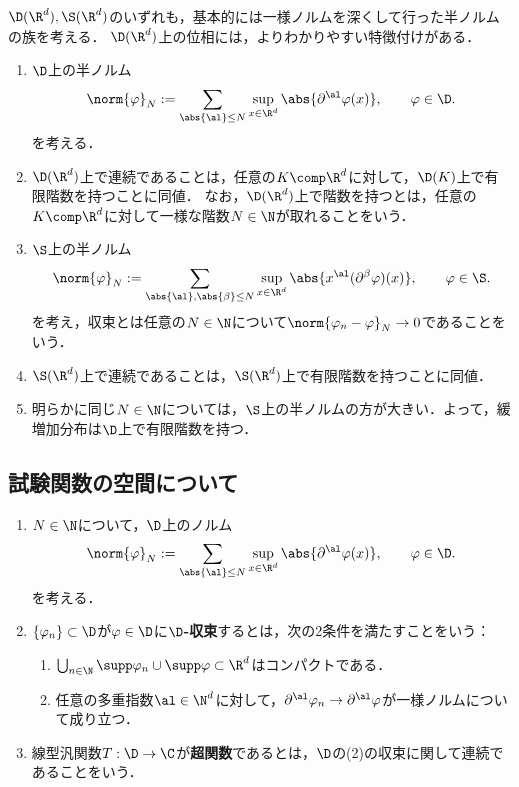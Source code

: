 \documentclass[uplatex,dvipdfmx]{jsreport}
\begin{document}
\begin{tcolorbox}[colframe=ForestGreen, colback=ForestGreen!10!white,breakable,colbacktitle=ForestGreen!40!white,coltitle=black,fonttitle=\bfseries\sffamily,
title=]
    $\D(\R^d),\S(\R^d)$のいずれも，基本的には一様ノルムを深くして行った半ノルムの族を考える．
    $\D(\R^d)$上の位相には，よりわかりやすい特徴付けがある．
    \begin{enumerate}
        \item $\D$上の半ノルム
        \[\norm{\varphi}_N:=\sum_{\abs{\al}\le N}\sup_{x\in\R^d}\abs{\partial^\al\varphi(x)},\qquad\varphi\in\D.\]
        を考える．
        \item $\D(\R^d)$上で連続であることは，任意の$K\comp\R^d$に対して，$\D(K)$上で有限階数を持つことに同値．
        なお，$\D(\R^d)$上で階数を持つとは，任意の$K\comp\R^d$に対して一様な階数$N\in\N$が取れることをいう．
        \item $\S$上の半ノルム
        \[\norm{\varphi}_N:=\sum_{\abs{\al},\abs{\beta}\le N}\sup_{x\in\R^d}\abs{x^\al(\partial^\beta\varphi)(x)},\qquad\varphi\in\S.\]
        を考え，収束とは任意の$N\in\N$について$\norm{\varphi_n-\varphi}_N\to0$であることをいう．
        \item $\S(\R^d)$上で連続であることは，$\S(\R^d)$上で有限階数を持つことに同値．
        \item 明らかに同じ$N\in\N$については，$\S$上の半ノルムの方が大きい．よって，緩増加分布は$\D$上で有限階数を持つ．
    \end{enumerate}
\end{tcolorbox}

\subsection{試験関数の空間について}

\begin{definition}\mbox{}
    \begin{enumerate}
        \item $N\in\N$について，$\D$上のノルム
        \[\norm{\varphi}_N:=\sum_{\abs{\al}\le N}\sup_{x\in\R^d}\abs{\partial^\al\varphi(x)},\qquad\varphi\in\D.\]
        を考える．
        \item $\{\varphi_n\}\subset\D$が$\varphi\in\D$に\textbf{$\D$-収束}するとは，次の2条件を満たすことをいう：
        \begin{enumerate}
            \item $\bigcup_{n\in\N}\supp\varphi_n\cup\supp\varphi\subset\R^d$はコンパクトである．
            \item 任意の多重指数$\al\in\N^d$に対して，$\partial^\al\varphi_n\to\partial^\al\varphi$が一様ノルムについて成り立つ．
        \end{enumerate}
        \item 線型汎関数$T:\D\to\C$が\textbf{超関数}であるとは，$\D$の(2)の収束に関して連続であることをいう．
    \end{enumerate}
\end{definition}
\end{document}
